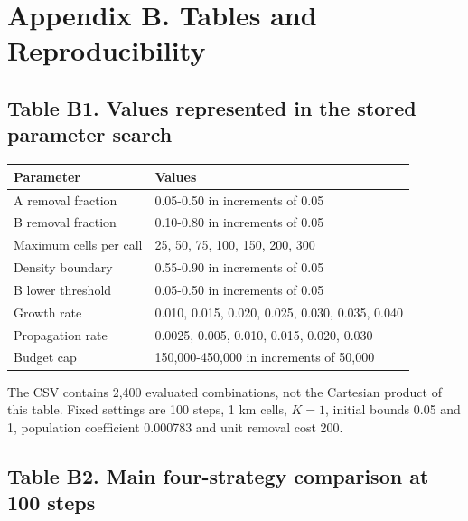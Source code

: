 \documentclass[a4paper,11pt]{article}
\begin{document}
\section*{Appendix B. Tables and Reproducibility}

\subsection*{Table B1. Values represented in the stored parameter search}

\begin{center}\renewcommand{\arraystretch}{1.15}\begin{tabular}{@{}p{.32\linewidth}p{.63\linewidth}@{}}\toprule

Parameter & Values \\

\midrule

A removal fraction & 0.05-0.50 in increments of 0.05 \\

B removal fraction & 0.10-0.80 in increments of 0.05 \\

Maximum cells per call & 25, 50, 75, 100, 150, 200, 300 \\

Density boundary & 0.55-0.90 in increments of 0.05 \\

B lower threshold & 0.05-0.50 in increments of 0.05 \\

Growth rate & 0.010, 0.015, 0.020, 0.025, 0.030, 0.035, 0.040 \\

Propagation rate & 0.0025, 0.005, 0.010, 0.015, 0.020, 0.030 \\

Budget cap & 150,000-450,000 in increments of 50,000 \\

\bottomrule\end{tabular}\end{center}

The CSV contains 2,400 evaluated combinations, not the Cartesian product of this table. Fixed settings are 100 steps, 1 km cells, $K=1$, initial bounds 0.05 and 1, population coefficient 0.000783 and unit removal cost 200.

\subsection*{Table B2. Main four-strategy comparison at 100 steps}
\end{document}
